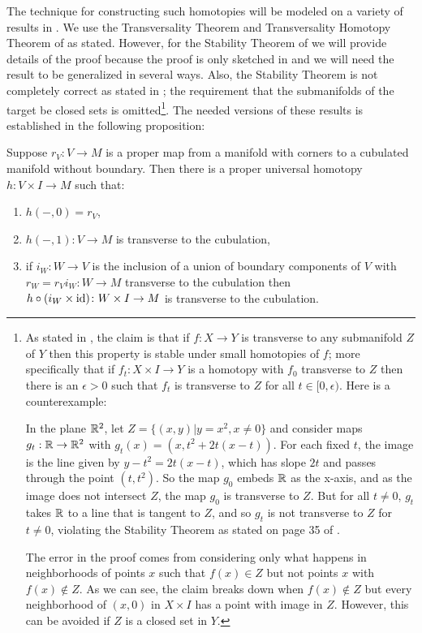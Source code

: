  The technique for constructing such homotopies will be modeled on a variety of results in \cite{GuPo74}. We use the Transversality Theorem and Transversality Homotopy Theorem of \cite[Section 2.3]{GuPo74} as stated. However, for the Stability Theorem of \cite[Section 1.6]{GuPo74} we will provide details of the proof because the proof is only sketched in \cite{GuPo74} and we will need the result to be generalized in several ways. Also, the Stability Theorem is not completely correct as stated in \cite[Section 1.6]{GuPo74}; the requirement that the submanifolds of the target be closed sets is omitted\footnote{As stated in \cite{GuPo74}, the claim is that if $f:X \to Y$ is transverse to any submanifold $Z$ of $Y$ then this property is stable under small homotopies of $f$; more specifically that if $f_t:X \times I \to Y$ is a homotopy with $f_0$ transverse to $Z$ then there is an $\epsilon>0$ such that $f_t$ is transverse to $Z$ for all $t\in[0,\epsilon)$. Here is a counterexample:

In the plane $\mathbb{R}^2$, let $Z = \{(x,y)|y = x^2, x\neq 0\}$ and consider maps $g_t: \mathbb{R} \to \mathbb{R}^2$ with
$g_t(x) = (x,t^2+2t(x-t))$. For each fixed $t$, the image is the line given by $y-t^2 = 2t(x-t)$, which has slope $2t$ and passes through the point $(t,t^2)$. So the map $g_0$ embeds $\mathbb{R}$ as the x-axis, and as the image does not intersect $Z$, the map $g_0$ is transverse to $Z$. But for all $t\neq 0$, $g_t$ takes $\mathbb{R}$ to a line that is tangent to $Z$, and so $g_t$ is not transverse to $Z$ for $t\neq 0$, violating the Stability Theorem as stated on page 35 of \cite{GuPo74}.

The error in the proof comes from considering only what happens in neighborhoods of points $x$ such that $f(x) \in Z$ but not points $x$ with $f(x)\notin Z$. As we can see, the claim breaks down when $f(x)\notin Z$ but every neighborhood of $(x,0)$ in $X \times I$ has a point with image in $Z$. However, this can be avoided if $Z$ is a closed set in $Y$.}. The needed versions of these results is established in the following proposition:




\begin{proposition}\label{P: ball stability}
Suppose $r_V \colon V \to M$ is a proper map from a manifold with corners to a cubulated manifold without boundary. Then there is a proper universal homotopy $h \colon V \times I \to M$ such that:
\begin{enumerate}
\item $h(-,0) = r_V$,

\item $h(-,1) \colon V \to M$ is transverse to the cubulation,

\item if $i_W \colon W \to V$ is the inclusion of a union of boundary components of $V$ with $r_W = r_Vi_W \colon W \to M$ transverse to the cubulation then $h\circ(i_{W} \times \mathrm{id}) \colon W \times I \to M$ is transverse to the cubulation.

\end{enumerate}
\end{proposition}



